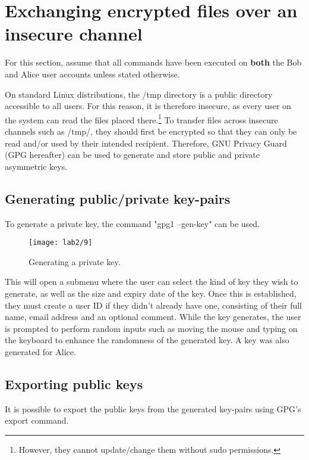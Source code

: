 \section{Exchanging encrypted files over an insecure channel}\label{sec:tmpExchange}
\begin{tcolorbox}[colback=orange!5!white,colframe=orange!75!black]
    For this section, assume that all commands have been executed on \textbf{both} the Bob and Alice
    user accounts unless stated otherwise.
\end{tcolorbox}
On standard Linux distributions, the /tmp directory is a public directory accessible to all users.
For this reason, it is therefore insecure, as every user on the system can read the files placed there.\footnote{However, they cannot update/change them without sudo permissions.}
To transfer files across insecure channels such as /tmp/, they should first be encrypted so that
they can only be read and/or used by their intended recipient.
Therefore, GNU Privacy Guard (GPG hereafter) can be used to generate and store public
and private asymmetric keys.

\subsection{Generating public/private key-pairs}\label{subsec:generating-private-keys}

To generate a private key, the command "gpg1 --gen-key" can be used.

\begin{figure}[H]
    \centering
    \texttt{[image: lab2/9]}
    \caption{Generating a private key.}
    \label{fig:GPGgen}
\end{figure}

This will open a submenu where the user can select the kind of key they wish to generate,
as well as the size and expiry date of the key.
Once this is established, they must create a user ID if they didn't already have one,
consisting of their full name, email address and an optional comment.
While the key generates, the user is prompted to perform random inputs such as moving the mouse
and typing on the keyboard to enhance the randomness of the generated key.
A key was also generated for Alice.

\pagebreak

\subsection{Exporting public keys}\label{subsec:exporting-public-keys}
It is possible to export the public keys from the generated key-pairs using GPG's export command.

